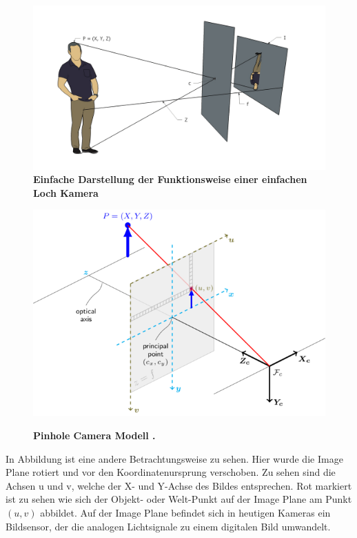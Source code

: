 \begin{figure}
\includegraphics[width=\textwidth]{media/simple-pinhole.png}\\
\caption{\textbf{Einfache Darstellung der Funktionsweise einer einfachen Loch Kamera}
}
\label{Fig:simple-pinhole}
\includegraphics[width=\textwidth]{media/pinhole_camera_model}\\
\caption{\textbf{Pinhole Camera Modell \autocite{OpencvCamera2016}.}
}
\label{Fig:pinhole}
\end{figure}

In Abbildung  ist eine andere Betrachtungsweise zu sehen. Hier wurde die Image Plane rotiert und vor den Koordinatenursprung verschoben. Zu sehen sind die Achsen u und v, welche der X- und Y-Achse des Bildes entsprechen. Rot markiert ist zu sehen wie sich der Objekt- oder Welt-Punkt auf der Image Plane am Punkt $(u, v)$ abbildet. Auf der Image Plane befindet sich in heutigen Kameras ein Bildsensor, der die analogen Lichtsignale zu einem digitalen Bild umwandelt. 

